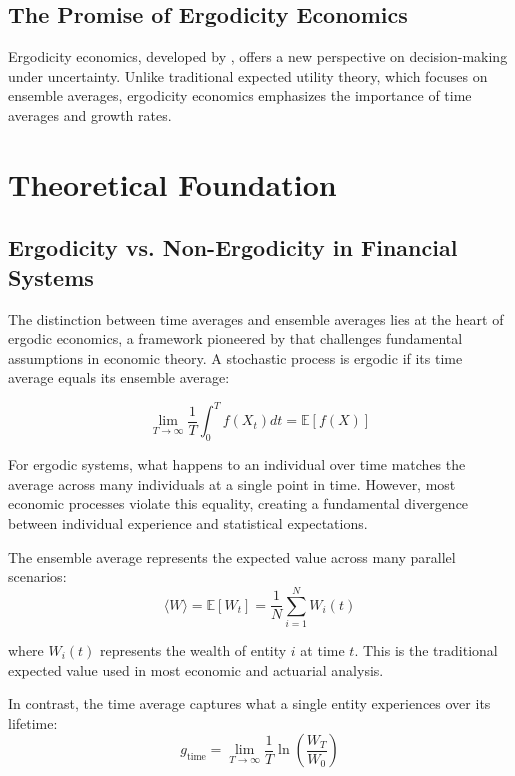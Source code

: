\documentclass[11pt,letterpaper]{article}
\newcommand{\E}{\mathbb{E}}
\begin{document}
\subsection{The Promise of Ergodicity Economics}

Ergodicity economics, developed by \citet{peters2025ergodicity}, offers a new perspective on decision-making under uncertainty. Unlike traditional expected utility theory, which focuses on ensemble averages, ergodicity economics emphasizes the importance of time averages and growth rates.


\section{Theoretical Foundation}

\subsection{Ergodicity vs. Non-Ergodicity in Financial Systems}

The distinction between time averages and ensemble averages lies at the heart of ergodic economics, a framework pioneered by \citet{peters2019ergodicity} that challenges fundamental assumptions in economic theory. A stochastic process is ergodic if its time average equals its ensemble average:

\begin{equation}
\lim_{T \to \infty} \frac{1}{T} \int_0^T f(X_t) dt = \E[f(X)]
\end{equation}

For ergodic systems, what happens to an individual over time matches the average across many individuals at a single point in time. However, most economic processes violate this equality, creating a fundamental divergence between individual experience and statistical expectations.

The ensemble average represents the expected value across many parallel scenarios:
\begin{equation}
\langle W \rangle = \E[W_t] = \frac{1}{N} \sum_{i=1}^{N} W_i(t)
\end{equation}

where $W_i(t)$ represents the wealth of entity $i$ at time $t$. This is the traditional expected value used in most economic and actuarial analysis.

In contrast, the time average captures what a single entity experiences over its lifetime:
\begin{equation}
g_{\text{time}} = \lim_{T \to \infty} \frac{1}{T} \ln\left(\frac{W_T}{W_0}\right)
\end{equation}
\end{document}
